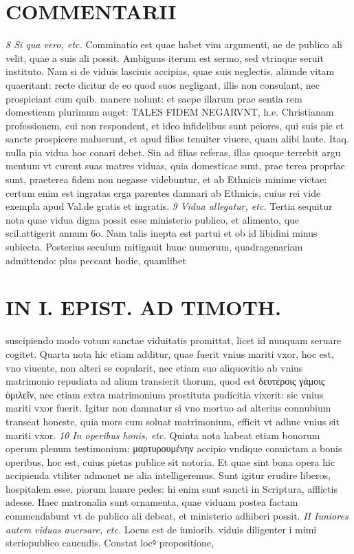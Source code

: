 \documentclass{article}
\begin{document}
\begin{pages}
\section*{COMMENTARII }
\marginpar{[ p.126 ]}
\textit{8 Si qua vero, etc. }\pstart Comminatio est quae habet vim argumenti, ne de publico ali velit, quae a suis ali possit. Ambiguus iterum est sermo, sed vtrinque seruit instituto. Nam si de viduis lasciuis accipias, quae suis neglectis, aliunde vitam quaeritant: recte dicitur de eo quod suos negligant, illis non consulant, nec prospiciant cum quib. manere nolunt: et saepe illarum prae sentia rem domesticam plurimum auget: TALES FIDEM NEGARVNT, h.e. Christianam professionem, cui non respondent, et ideo infidelibus sunt peiores, qui suis pie et sancte prospicere maluerunt, et apud filios tenuiter viuere, quam alibi laute. Itaq. nulla pia vidua hoc conari debet. Sin ad filias referas, illas quoque terrebit argu mentum vt curent suas matres viduas, quia domesticae sunt, prae terea propriae sunt, praeterea fidem non negasse videbuntur, et ab Ethnicis minime victae: certum enim est ingratas erga parentes damnari ab Ethnicis, cuius rei vide exempla apud Val.de gratis et ingratis.  \pend
\textit{9 Vidua allegatur, etc. }\pstart Tertia sequitur nota quae vidua digna possit esse ministerio publico, et alimento, que scil.attigerit annum 6o. Nam talis inepta est partui et ob id libidini minus subiecta. Posterius seculum mitigauit hunc numerum, quadragenariam admittendo: plus peccant hodie, quamlibet  \pend
\section*{IN I. EPIST. AD TIMOTH. }
\marginpar{[ p.127 ]}\pstart suscipiendo modo votum sanctae viduitatis promittat, licet id nunquam seruare cogitet.  \pend\pstart Quarta nota hic etiam additur, quae fuerit vnius mariti vxor, hoc est, vno viuente, non alteri se copularit, nec etiam suo aliquovitio ab vnius matrimonio repudiata ad alium transierit thorum, quod est δευτέροις γάμοις ὁμιλεῖν, nec etiam extra matrimonium prostituta pudicitia vixerit: sic vnius mariti vxor fuerit. Igitur non damnatur si vno mortuo ad alterius connubium transeat honeste, quia mors cum soluat matrimonium, efficit vt adhuc vnius sit mariti vxor.  \pend
\textit{10 In operibus honis, etc. }\pstart Quinta nota habeat etiam bonorum operum plenum testimonium: μαρτυρουμένην accipio vndique conuictam a bonis operibus, hoc est, cuius pietas publice sit notoria. Et quae sint bona opera hic accipienda vtiliter admonet ne alia intelligeremus. Sunt igitur erudire liberos, hospitalem esse, piorum lauare pedes: hi enim sunt sancti in Scriptura, afflictis adesse. Haec matronalia sunt ornamenta, quae viduam postea factam commendabunt vt de publico ali debeat, et ministerio adhiberi possit.  \pend
\textit{II Iuniores autem viduas auersare, etc. }\pstart Locus est de iuniorib. viduis diligenter i mimi steriopublico cauendis. Constat locꝰ propositione,  \pend

\end{pages}
\end{document}
